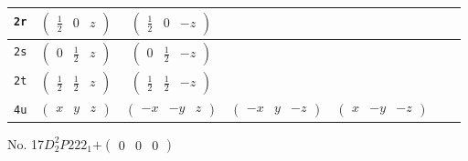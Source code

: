\documentclass[fleqn,9pt,landscape]{jsarticle}
\begin{document}
\begin{center}
\begin{longtable}{ccccccc}
{\tt 2r} & $ \begin{pmatrix} \frac{1}{2} & 0 & z \end{pmatrix} $ & $ \begin{pmatrix} \frac{1}{2} & 0 & - z \end{pmatrix} $ & $  $ & $  $ \\ \hline
{\tt 2s} & $ \begin{pmatrix} 0 & \frac{1}{2} & z \end{pmatrix} $ & $ \begin{pmatrix} 0 & \frac{1}{2} & - z \end{pmatrix} $ & $  $ & $  $ \\ \hline
{\tt 2t} & $ \begin{pmatrix} \frac{1}{2} & \frac{1}{2} & z \end{pmatrix} $ & $ \begin{pmatrix} \frac{1}{2} & \frac{1}{2} & - z \end{pmatrix} $ & $  $ & $  $ \\ \hline
{\tt 4u} & $ \begin{pmatrix} x & y & z \end{pmatrix} $ & $ \begin{pmatrix} - x & - y & z \end{pmatrix} $ & $ \begin{pmatrix} - x & y & - z \end{pmatrix} $ & $ \begin{pmatrix} x & - y & - z \end{pmatrix} $ \\
\end{longtable}
\end{center}
\newpage
No. 17\quad$D_{2}^{2}$\quad$P222_1$\quad[ orthorhombic ]\quad$+\begin{pmatrix} 0 & 0 & 0 \end{pmatrix}$
\end{document}
